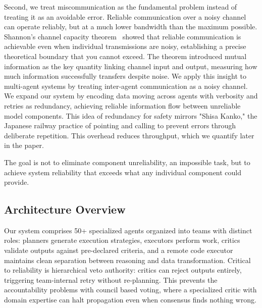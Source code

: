 \documentclass[sigconf]{acmart}
\newcommand{\reviewnote}[1]{}
\newcommand{\reviewnote}[1]{\marginnote{\raggedright\footnotesize\textit{#1}}}
\begin{document}
Second, we treat miscommunication as the fundamental problem instead of treating it as an avoidable error. Reliable communication over a noisy channel can operate reliably, but at a much lower bandwidth than the maximum possible. Shannon's channel capacity theorem~\cite{Shannon1948} showed that reliable communication is achievable even when individual transmissions are noisy, establishing a precise theoretical boundary that you cannot exceed. The theorem introduced mutual information as the key quantity linking channel input and output, measuring how much information successfully transfers despite noise.\reviewnote{Clever analogy, but needs clarification: how does "mutual information" specifically map to inter-agent communication? What is being transmitted/received in your model?} We apply this insight to multi-agent systems by treating inter-agent communication as a noisy channel. We expand our system by encoding data moving across agents with verbosity and retries as redundancy, achieving reliable information flow between unreliable model components. This idea of redundancy for safety mirrors "Shisa Kanko," the Japanese railway practice of pointing and calling to prevent errors through deliberate repetition. This overhead reduces throughput, which we quantify later in the paper.

\ifdefined\isrelease
\else
\fi

The goal is not to eliminate component unreliability, an impossible task, but to achieve system reliability that exceeds what any individual component could provide.

\subsection{Architecture Overview}

Our system comprises 50+ specialized agents organized into teams with distinct roles: planners generate execution strategies, executors perform work, critics validate outputs against pre-declared criteria, and a remote code executor maintains clean separation between reasoning and data transformation. Critical to reliability is hierarchical veto authority: critics can reject outputs entirely, triggering team-internal retry without re-planning. This prevents the accountability problems with council based voting, where a specialized critic with domain expertise can halt propagation even when consensus finds nothing wrong.
\end{document}

